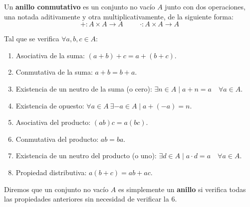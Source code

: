 \begin{definicion}
    Un \textbf{anillo conmutativo} es un conjunto no vacío $A$ junto con dos operaciones, una notada aditivamente y otra
    multiplicativamente, de la siguiente forma:
    \begin{equation*}
        +:A\times A\longrightarrow A
        \hspace{1cm}
        \cdot:A\times A\longrightarrow A
    \end{equation*}
    
    Tal que se verifica $\forall a,b,c \in A$:
    \begin{enumerate}
        \item Asociativa de la suma: $(a+b)+c = a+(b+c)$.
        \item Conmutativa de la suma: $a+b = b+a$.
        \item Existencia de un neutro de la suma (o cero): $\exists n \in A \mid a + n = a \quad \forall a\in A$.
        \item Existencia de opuesto: $\forall a\in A~\exists -a \in A \mid a + (-a) = n$.
        \item Asociativa del producto: $(ab)c = a(bc)$.
        \item Conmutativa del producto: $ab=ba$.
        \item Existencia de un neutro del producto (o uno): $\exists d \in A \mid a \cdot d = a\quad \forall a\in A$.
        \item Propiedad distributiva: $a(b+c) = ab + ac$.
    \end{enumerate}
\end{definicion}

Diremos que un conjunto no vacío $A$ es simplemente un \textbf{anillo} si verifica todas las propiedades anteriores sin necesidad de
verificar la $6$.

